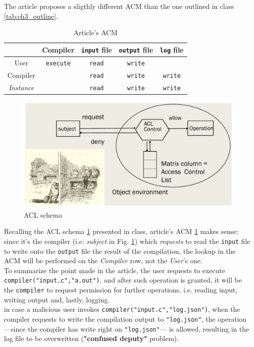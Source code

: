 \begin{paracol}{2}
   The article proposes a sligthly different ACM than the one outlined in class \ref{tab:ch3_outline}.
   \begin{table}[htbp]
      \centering
      \begin{tabular}{c|c|c|c|c|}
         & Compiler & \texttt{input} file & \texttt{output} file &\texttt{log} file\\
         \hline
         User & \texttt{execute} & \texttt{read} & \texttt{write} &\\
         \hline
         Compiler & & \texttt{read} & \texttt{write} & \texttt{write}\\
         \hline
         \textit{Instance} & & \texttt{read} & \texttt{write} & \texttt{write}\\
      \end{tabular}
      \caption{Article's ACM}
      \label{tab:ch3_articleACM}
   \end{table}
\switchcolumn

\begin{figure}[htbp]
   \centering
   \includegraphics[width=0.9\columnwidth]{images/ACL_schema.png}
   \caption{ACL schema}
   \label{fig:ACL_schema2}
\end{figure}
\end{paracol}

Recalling the ACL schema \ref{fig:ACL_schema2} presented in class, article's ACM \ref{tab:ch3_articleACM} makes sense:
since it's the compiler (i.e. \textit{subject} in Fig. \ref{fig:ACL_schema2}) which \textit{requests} to read the \texttt{input} file to write onto the \texttt{output} file the result of the compilation,
the lookup in the ACM will be performed on the \textit{Compiler} row, not the \textit{User}'s one.\\
To summarize the point made in the article,
the user requests to execute \texttt{compiler("input.c","a.out")}, and after such operation is granted,
it will be the \texttt{compiler} to request permission for further operations, i.e. reading input, writing output and, lastly, logging.\\
in case a malicious user invokes \texttt{compiler("input.c","log.json")},
when the compiler requests to write the compilation output to \texttt{"log.json"}, the operation {---}since the compiler has write right on \texttt{"log.json"}{---} is allowed,
resulting in the log file to be overwritten (\textbf{"confused deputy"} problem).\nl

